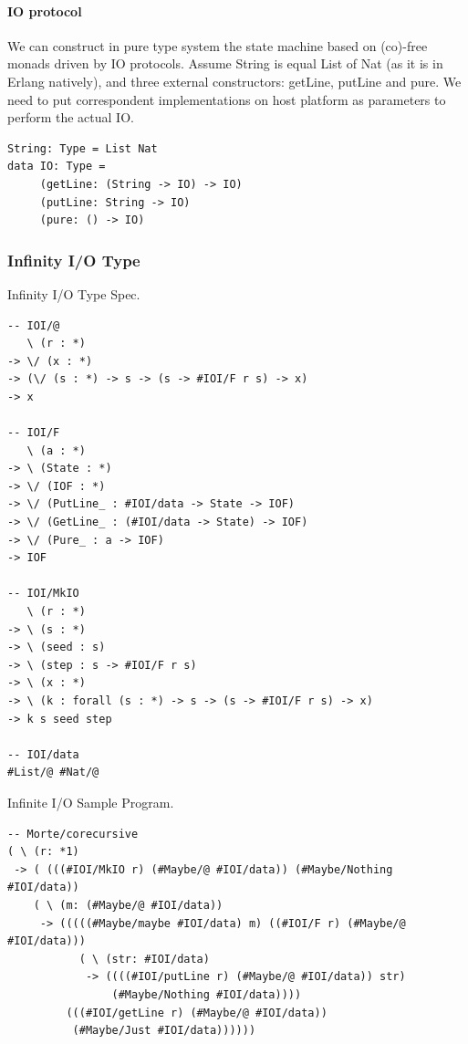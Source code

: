 \documentclass[11pt,oneside]{article}
\begin{document}
\paragraph{IO protocol}
We can construct in pure type system the state machine based on (co)-free
monads driven by IO protocols. Assume String is equal List of Nat (as it is in Erlang natively),
and three external constructors: getLine, putLine and pure. We need to
put correspondent implementations on host platform as parameters to perform the actual IO.

\begin{lstlisting}[mathescape=true]
String: Type = List Nat
data IO: Type =
     (getLine: (String -> IO) -> IO)
     (putLine: String -> IO)
     (pure: () -> IO)
\end{lstlisting}

\subsubsection{Infinity I/O Type}

Infinity I/O Type Spec.

\begin{lstlisting}[mathescape=true]
-- IOI/@
   \ (r : *)
-> \/ (x : *)
-> (\/ (s : *) -> s -> (s -> #IOI/F r s) -> x)
-> x

-- IOI/F
   \ (a : *)
-> \ (State : *)
-> \/ (IOF : *)
-> \/ (PutLine_ : #IOI/data -> State -> IOF)
-> \/ (GetLine_ : (#IOI/data -> State) -> IOF)
-> \/ (Pure_ : a -> IOF)
-> IOF

-- IOI/MkIO
   \ (r : *)
-> \ (s : *)
-> \ (seed : s)
-> \ (step : s -> #IOI/F r s)
-> \ (x : *)
-> \ (k : forall (s : *) -> s -> (s -> #IOI/F r s) -> x)
-> k s seed step

-- IOI/data
#List/@ #Nat/@
\end{lstlisting}

\newpage
Infinite I/O Sample Program.

\begin{lstlisting}[mathescape=true]
-- Morte/corecursive
( \ (r: *1)
 -> ( (((#IOI/MkIO r) (#Maybe/@ #IOI/data)) (#Maybe/Nothing #IOI/data))
    ( \ (m: (#Maybe/@ #IOI/data))
     -> (((((#Maybe/maybe #IOI/data) m) ((#IOI/F r) (#Maybe/@ #IOI/data)))
           ( \ (str: #IOI/data)
            -> ((((#IOI/putLine r) (#Maybe/@ #IOI/data)) str)
                (#Maybe/Nothing #IOI/data))))
         (((#IOI/getLine r) (#Maybe/@ #IOI/data))
          (#Maybe/Just #IOI/data))))))
\end{lstlisting}
\end{document}
